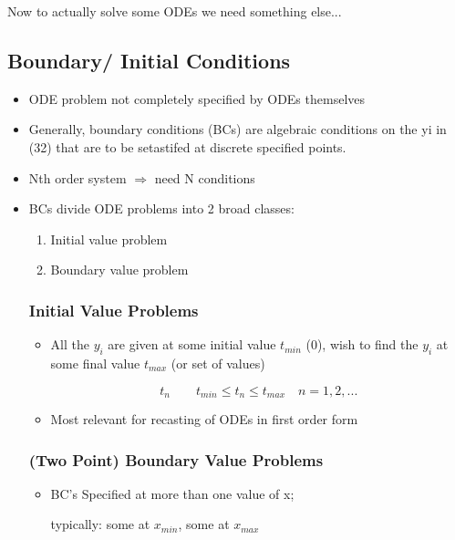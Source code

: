 Now to actually solve some ODEs we need something else...

\subsection{Boundary/ Initial Conditions}

\begin{itemize}
    \item ODE problem not completely specified by ODEs themselves
    \item Generally, boundary conditions (BCs) are algebraic conditions on the yi in (32) that are to be setastifed at discrete specified points.

    \item Nth order system $\Rightarrow$ need N conditions

    \item BCs divide ODE problems into 2 broad classes:

    
    \begin{enumerate}
        \item Initial value problem
        \item Boundary value problem
    \end{enumerate}
    
    \subsubsection{Initial Value Problems}
    
    \begin{itemize}
        \item  All the $y_i$ are given at some initial value $t_{min}$ (0), wish to find the $y_i$ at some final value $t_{max}$ (or set of values)

        \[ t_n \qquad t_{min} \leq t_n \leq t_{max} \quad n=1,2,...\]

        \item Most relevant for recasting of ODEs in first order form
    \end{itemize}

    \subsubsection{(Two Point) Boundary Value Problems}

    \begin{itemize}
        \item BC's Specified at more than one value of x; 

        typically: some at $x_{min}$, some at $x_{max}$
    \end{itemize}
\end{itemize}

